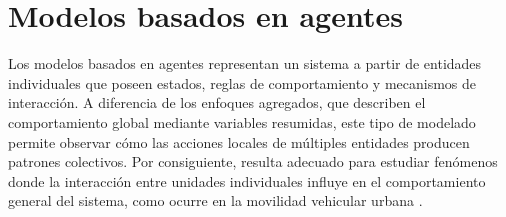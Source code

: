 \begingroup
\let\seccionoriginal\section
\let\subseccionoriginal\subsection
\renewcommand{\section}[1]{\seccionoriginal{#1}\mbox{}\par}
\renewcommand{\subsection}[1]{\subseccionoriginal{#1}\mbox{}\par}

\section{Modelos basados en agentes}
\label{subsec:modelos_basados_agentes}

Los modelos basados en agentes representan un sistema a partir de entidades individuales que poseen estados, reglas de comportamiento y mecanismos de interacción. A diferencia de los enfoques agregados, que describen el comportamiento global mediante variables resumidas, este tipo de modelado permite observar cómo las acciones locales de múltiples entidades producen patrones colectivos. Por consiguiente, resulta adecuado para estudiar fenómenos donde la interacción entre unidades individuales influye en el comportamiento general del sistema, como ocurre en la movilidad vehicular urbana \cite{russell1995ai,macal2010abms,bonabeau2002abm}.

